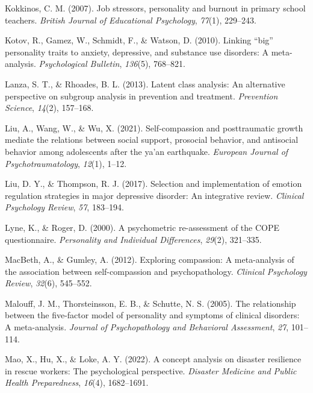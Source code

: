 \documentclass[
  man]{apa7}
\newlength{\cslhangindent}
\newlength{\cslentryspacingunit} %
\newenvironment{CSLReferences}[2] %
 {%
  \setlength{\parindent}{0pt}
  \ifodd #1
  \let\oldpar\par
  \def\par{\hangindent=\cslhangindent\oldpar}
  \fi
  \setlength{\parskip}{#2\cslentryspacingunit}
 }%
 {}
\begin{document}
\begin{CSLReferences}{1}{0}
\leavevmode{}%
Kokkinos, C. M. (2007). Job stressors, personality and burnout in primary school teachers. \emph{British Journal of Educational Psychology}, \emph{77}(1), 229--243.

\leavevmode{}%
Kotov, R., Gamez, W., Schmidt, F., \& Watson, D. (2010). Linking {``big''} personality traits to anxiety, depressive, and substance use disorders: A meta-analysis. \emph{Psychological Bulletin}, \emph{136}(5), 768--821.

\leavevmode{}%
Lanza, S. T., \& Rhoades, B. L. (2013). Latent class analysis: An alternative perspective on subgroup analysis in prevention and treatment. \emph{Prevention Science}, \emph{14}(2), 157--168.

\leavevmode{}%
Liu, A., Wang, W., \& Wu, X. (2021). Self-compassion and posttraumatic growth mediate the relations between social support, prosocial behavior, and antisocial behavior among adolescents after the ya'an earthquake. \emph{European Journal of Psychotraumatology}, \emph{12}(1), 1--12.

\leavevmode{}%
Liu, D. Y., \& Thompson, R. J. (2017). Selection and implementation of emotion regulation strategies in major depressive disorder: An integrative review. \emph{Clinical Psychology Review}, \emph{57}, 183--194.

\leavevmode{}%
Lyne, K., \& Roger, D. (2000). A psychometric re-assessment of the COPE questionnaire. \emph{Personality and Individual Differences}, \emph{29}(2), 321--335.

\leavevmode{}%
MacBeth, A., \& Gumley, A. (2012). Exploring compassion: A meta-analysis of the association between self-compassion and psychopathology. \emph{Clinical Psychology Review}, \emph{32}(6), 545--552.

\leavevmode{}%
Malouff, J. M., Thorsteinsson, E. B., \& Schutte, N. S. (2005). The relationship between the five-factor model of personality and symptoms of clinical disorders: A meta-analysis. \emph{Journal of Psychopathology and Behavioral Assessment}, \emph{27}, 101--114.

\leavevmode{}%
Mao, X., Hu, X., \& Loke, A. Y. (2022). A concept analysis on disaster resilience in rescue workers: The psychological perspective. \emph{Disaster Medicine and Public Health Preparedness}, \emph{16}(4), 1682--1691.


\end{CSLReferences}
\end{document}
